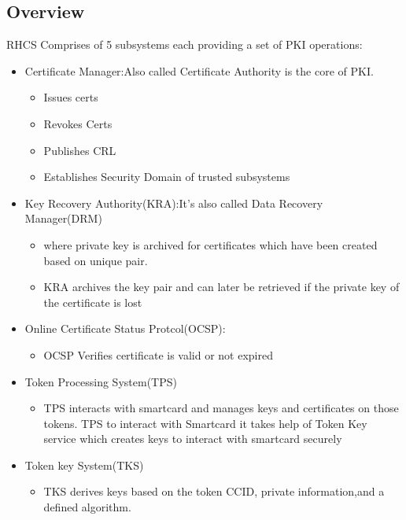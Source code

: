 \documentclass[a4paper]{article}
\begin{document}
\subsection{Overview}
    RHCS Comprises of 5 subsystems each providing a set of PKI operations:
    \begin{itemize}
        \item Certificate Manager:Also called Certificate Authority is the core of PKI.
            \begin{itemize}
                \item Issues certs
                \item Revokes Certs
                \item Publishes CRL
                \item Establishes Security Domain of trusted subsystems
            \end{itemize}
        \item Key Recovery Authority(KRA):It's also called Data Recovery Manager(DRM) 
            \begin{itemize}
                \item where private key is archived for certificates which have been created based on unique pair. 
                \item KRA archives the key pair and can later be retrieved if the private key of the certificate is lost
            \end{itemize}
        \item Online Certificate Status Protcol(OCSP): 
            \begin{itemize}
                \item OCSP Verifies certificate is valid or not expired
            \end{itemize}
        \item Token Processing System(TPS)
            \begin{itemize}
                \item TPS interacts with smartcard and manages keys and certificates on those tokens. TPS to interact
                    with Smartcard it takes help of Token Key service which creates keys to interact with smartcard securely
            \end{itemize}
        \item Token key System(TKS)
            \begin{itemize}
                \item TKS derives keys based on the token CCID, private information,and a defined algorithm. 

\end{itemize}
\end{itemize}
\end{document}
